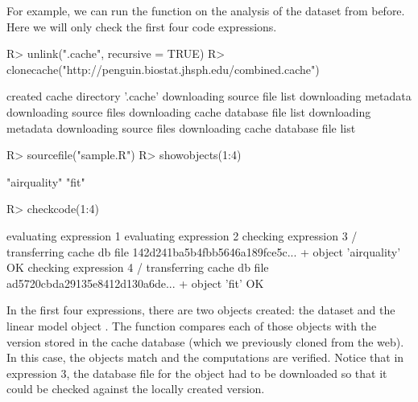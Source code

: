 \documentclass[nojss]{jss}
\begin{document}
For example, we can run the  function on the analysis
of the  dataset from before.  Here we will only check
the first four code expressions.
\begin{Schunk}
\begin{Sinput}
R> unlink(".cache", recursive = TRUE)
R> clonecache("http://penguin.biostat.jhsph.edu/combined.cache")
\end{Sinput}
\begin{Soutput}
created cache directory '.cache'
downloading source file list
downloading metadata
downloading source files
downloading cache database file list
downloading metadata
downloading source files
downloading cache database file list
\end{Soutput}
\begin{Sinput}
R> sourcefile("sample.R")
R> showobjects(1:4)
\end{Sinput}
\begin{Soutput}
[1] "airquality" "fit"       
\end{Soutput}
\begin{Sinput}
R> checkcode(1:4)
\end{Sinput}
\begin{Soutput}
evaluating expression 1
evaluating expression 2
checking expression 3
/ transferring cache db file 142d241ba5b4fbb5646a189fce5c...
+ object 'airquality' OK
checking expression 4
/ transferring cache db file ad5720cbda29135e8412d130a6de...
+ object 'fit' OK
\end{Soutput}
\end{Schunk}
In the first four expressions, there are two objects created: the
dataset  and the linear model object .  The
 function compares each of those objects with the
version stored in the cache database (which we previously cloned from
the web).  In this case, the objects match and the computations are
verified.  Notice that in expression 3, the database file for the
 object had to be downloaded so that it could be
checked against the locally created version.
\end{document}
